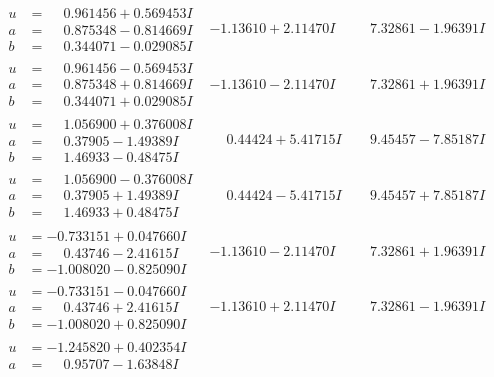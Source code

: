 \documentclass[1p]{elsarticle_modified}
\theoremstyle{definition}
\begin{document}
$$\begin{array}{c|c|c}
\begin{aligned}
u &= \phantom{-}0.961456 + 0.569453 I \\
a &= \phantom{-}0.875348 - 0.814669 I \\
b &= \phantom{-}0.344071 - 0.029085 I\end{aligned}
 & -1.13610 + 2.11470 I & \phantom{-}7.32861 - 1.96391 I \\ \hline\begin{aligned}
u &= \phantom{-}0.961456 - 0.569453 I \\
a &= \phantom{-}0.875348 + 0.814669 I \\
b &= \phantom{-}0.344071 + 0.029085 I\end{aligned}
 & -1.13610 - 2.11470 I & \phantom{-}7.32861 + 1.96391 I \\ \hline\begin{aligned}
u &= \phantom{-}1.056900 + 0.376008 I \\
a &= \phantom{-}0.37905 - 1.49389 I \\
b &= \phantom{-}1.46933 - 0.48475 I\end{aligned}
 & \phantom{-}0.44424 + 5.41715 I & \phantom{-}9.45457 - 7.85187 I \\ \hline\begin{aligned}
u &= \phantom{-}1.056900 - 0.376008 I \\
a &= \phantom{-}0.37905 + 1.49389 I \\
b &= \phantom{-}1.46933 + 0.48475 I\end{aligned}
 & \phantom{-}0.44424 - 5.41715 I & \phantom{-}9.45457 + 7.85187 I \\ \hline\begin{aligned}
u &= -0.733151 + 0.047660 I \\
a &= \phantom{-}0.43746 - 2.41615 I \\
b &= -1.008020 - 0.825090 I\end{aligned}
 & -1.13610 - 2.11470 I & \phantom{-}7.32861 + 1.96391 I \\ \hline\begin{aligned}
u &= -0.733151 - 0.047660 I \\
a &= \phantom{-}0.43746 + 2.41615 I \\
b &= -1.008020 + 0.825090 I\end{aligned}
 & -1.13610 + 2.11470 I & \phantom{-}7.32861 - 1.96391 I \\ \hline\begin{aligned}
u &= -1.245820 + 0.402354 I \\
a &= \phantom{-}0.95707 - 1.63848 I \\

\end{aligned}
\end{array}$$
\end{document}
